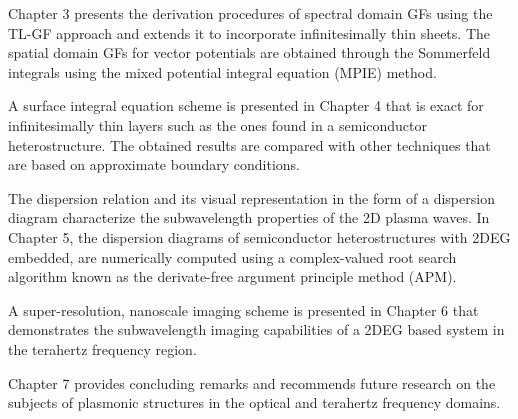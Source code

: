 Chapter 3 presents the derivation procedures of spectral domain GFs using the TL-GF approach \cite{Michalski1997,Michalski2005} and extends it to incorporate infinitesimally thin sheets. The spatial domain GFs for vector potentials are obtained through the Sommerfeld integrals using the mixed potential integral equation (MPIE) method.

A surface integral equation scheme is presented in Chapter 4 that is exact for infinitesimally thin layers such as the ones found in a semiconductor heterostructure. The obtained results are compared with other techniques that are based on approximate boundary conditions.

The dispersion relation and its visual representation in the form of a dispersion diagram characterize the subwavelength properties of the 2D plasma waves. In Chapter 5, the dispersion diagrams of semiconductor heterostructures with 2DEG embedded, are numerically computed using a complex-valued root search algorithm known as the derivate-free argument principle method (APM).

A super-resolution, nanoscale imaging scheme is presented in Chapter 6 that demonstrates the subwavelength imaging capabilities of a 2DEG based system in the terahertz frequency region.

Chapter 7 provides concluding remarks and recommends future research on the subjects of plasmonic structures in the optical and terahertz frequency domains.
